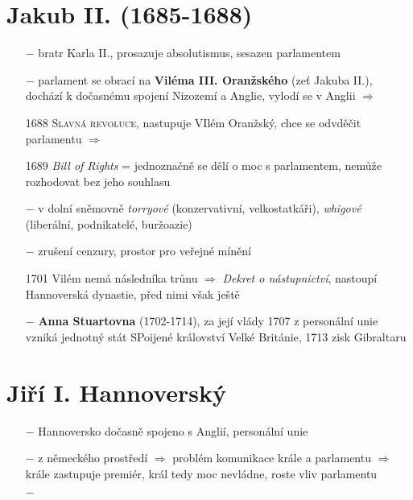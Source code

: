 \documentclass{article}
\begin{document}
\section*{Jakub II. (1685-1688)}
\begin{itemize}
    \vspace{-0.5em}
    \setlength\itemsep{0.15em}
    \item[$-$] bratr Karla II., prosazuje absolutismus, sesazen parlamentem
    \item[$-$] parlament se obrací na \textbf{Viléma III. Oranžského} (zeť Jakuba II.), dochází k dočasnému spojení Nizozemí a Anglie, vylodí se v Anglii $\Rightarrow$
    \item[1688] \textsc{Slavná revoluce}, nastupuje VIlém Oranžský, chce se odvděčit parlamentu $\Rightarrow$
    \item[1689] \textit{Bill of Rights} = jednoznačně se dělí o moc s parlamentem, nemůže rozhodovat bez jeho souhlasu
    \item[$-$] v dolní sněmovně \textit{torryové} (konzervativní, velkostatkáři), \textit{whigové} (liberální, podnikatelé, buržoazie)
    \item[$-$] zrušení cenzury, prostor pro veřejné mínění
    \item[1701] Vilém nemá následníka trůnu $\Rightarrow$ \textit{Dekret o nástupnictví}, nastoupí Hannoverská dynastie, před nimi však ještě
    \item[$-$] \textbf{Anna Stuartovna} (1702-1714), za její vlády 1707 z personální unie vzniká jednotný stát SPoijené království Velké Británie, 1713 zisk Gibraltaru
\end{itemize}

\section*{Jiří I. Hannoverský}
\begin{itemize}
    \vspace{-0.5em}
    \setlength\itemsep{0.15em}
    \item[$-$] Hannoversko dočasně spojeno s Anglií, personální unie
    \item[$-$] z německého prostředí $\Rightarrow$ problém komunikace krále a parlamentu $\Rightarrow$ krále zastupuje premiér, král tedy moc nevládne, roste vliv parlamentu
    \item[$-$]
\end{itemize}
\end{document}
